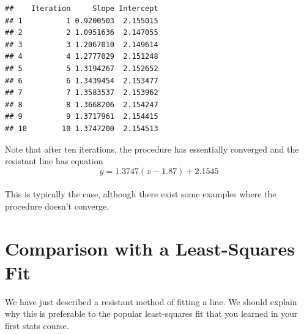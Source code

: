 \documentclass[
]{book}
\newenvironment{Shaded}{\begin{snugshade}}{\end{snugshade}}
\newcommand{\AttributeTok}[1]{\textcolor[rgb]{0.77,0.63,0.00}{#1}}
\newcommand{\ConstantTok}[1]{\textcolor[rgb]{0.00,0.00,0.00}{#1}}
\newcommand{\ControlFlowTok}[1]{\textcolor[rgb]{0.13,0.29,0.53}{\textbf{#1}}}
\newcommand{\DecValTok}[1]{\textcolor[rgb]{0.00,0.00,0.81}{#1}}
\newcommand{\FloatTok}[1]{\textcolor[rgb]{0.00,0.00,0.81}{#1}}
\newcommand{\FunctionTok}[1]{\textcolor[rgb]{0.00,0.00,0.00}{#1}}
\newcommand{\NormalTok}[1]{#1}
\newcommand{\OtherTok}[1]{\textcolor[rgb]{0.56,0.35,0.01}{#1}}
\newcommand{\SpecialCharTok}[1]{\textcolor[rgb]{0.00,0.00,0.00}{#1}}
\begin{document}
\begin{Shaded}
\end{Shaded}

\begin{verbatim}
##    Iteration     Slope Intercept
## 1          1 0.9200503  2.155015
## 2          2 1.0951636  2.147055
## 3          3 1.2067010  2.149614
## 4          4 1.2777029  2.151248
## 5          5 1.3194267  2.152652
## 6          6 1.3439454  2.153477
## 7          7 1.3583537  2.153962
## 8          8 1.3668206  2.154247
## 9          9 1.3717961  2.154415
## 10        10 1.3747200  2.154513
\end{verbatim}

Note that after ten iterations, the procedure has essentially converged and the resistant line has equation
\[          
          y = 1.3747 (x - 1.87) + 2.1545
\]\\
This is typically the case, although there exist some examples where the procedure doesn't converge.

\hypertarget{comparison-with-a-least-squares-fit}{%
\section{Comparison with a Least-Squares Fit}\label{comparison-with-a-least-squares-fit}}

We have just described a resistant method of fitting a line. We should explain why this is preferable to the popular least-squares fit that you learned in your first stats course.
\end{document}
